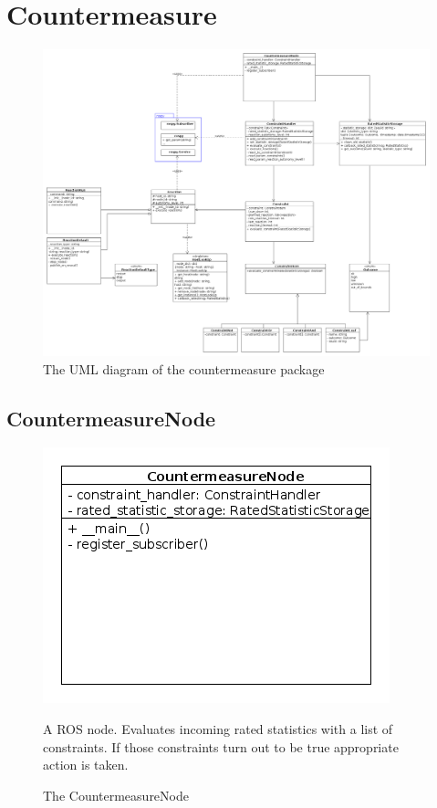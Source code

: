 \newpage
\section{Countermeasure}
\begin{figure}[!ht]
\begin{center}
\includegraphics[width=1.0\linewidth]{./diagram_pictures/reactor/reactor.png}
\caption{The UML diagram of the countermeasure package}
\end{center}
\end{figure}

\mbox{}

\newpage


\newpage
\subsection{CountermeasureNode}
\begin{figure}[htbp]
	\begin{minipage}[t]{8cm}
		\vspace{0pt}
		\centering
		\includegraphics[scale=0.6]{./diagram_pictures/reactor/CountermeasureNode.png}
		\caption{The CountermeasureNode}
	\end{minipage}
	\hfill
	\begin{minipage}[t]{8cm}
		\vspace{10pt}
			A ROS node. Evaluates incoming rated statistics with a list of constraints. If those constraints turn out to be true appropriate action is taken.
	\end{minipage}
\end{figure}  


